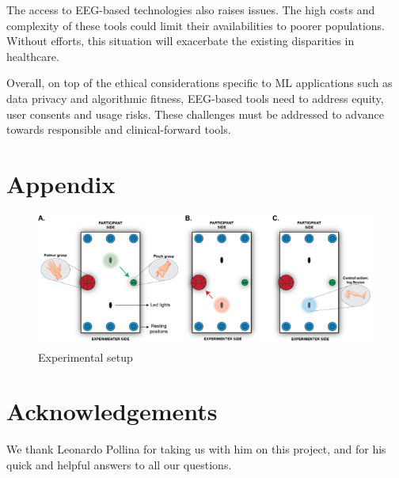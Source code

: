 \documentclass[10pt,conference,compsocconf]{IEEEtran}
\begin{document}
The access to EEG-based technologies also raises issues. The high costs and complexity of these tools could limit their availabilities to poorer populations. Without efforts, this situation will exacerbate the existing disparities in healthcare.

Overall, on top of the ethical considerations specific to ML applications such as data privacy and algorithmic fitness, EEG-based tools need to address equity, user consents and usage risks. These challenges must be addressed to advance towards responsible and clinical-forward tools.

\section{Appendix}

\begin{figure}[h!]
    \center
    \includegraphics[width=\linewidth]{images/2024-12-11-13-41-23.png}
    \caption{Experimental setup}
\end{figure}
\FloatBarrier




\section*{Acknowledgements}
We thank Leonardo Pollina for taking us with him on this project, and for his quick and helpful answers to all our questions.



\end{document}
